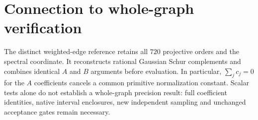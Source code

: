 \documentclass[11pt]{article}
\begin{document}
\section{Connection to whole-graph verification}
The distinct weighted-edge reference retains all \(720\) projective
orders and the spectral coordinate. It reconstructs rational Gaussian
Schur complements and combines identical \(A\) and \(B\) arguments
before evaluation. In particular, \(\sum_j c_j=0\) for the \(A\)
coefficients cancels a common primitive normalization constant.
Scalar tests alone do not establish a whole-graph precision result:
full coefficient identities, native interval enclosures, new independent
sampling and unchanged acceptance gates remain necessary.
\end{document}
